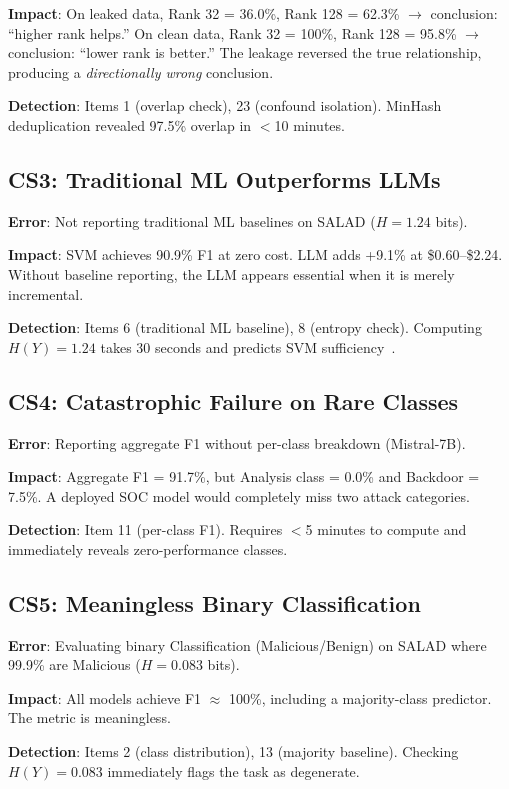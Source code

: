 \documentclass[review,3p]{elsarticle}
\begin{document}
\textbf{Impact}: On leaked data, Rank 32 = 36.0\%, Rank 128 = 62.3\% $\to$ conclusion: ``higher rank helps.'' On clean data, Rank 32 = 100\%, Rank 128 = 95.8\% $\to$ conclusion: ``lower rank is better.'' The leakage reversed the true relationship, producing a \emph{directionally wrong} conclusion.

\textbf{Detection}: Items 1 (overlap check), 23 (confound isolation). MinHash deduplication revealed 97.5\% overlap in $<$10 minutes.

\subsection{CS3: Traditional ML Outperforms LLMs}
\textbf{Error}: Not reporting traditional ML baselines on SALAD ($H = 1.24$ bits).

\textbf{Impact}: SVM achieves 90.9\% F1 at zero cost. LLM adds +9.1\% at \$0.60--\$2.24. Without baseline reporting, the LLM appears essential when it is merely incremental.

\textbf{Detection}: Items 6 (traditional ML baseline), 8 (entropy check). Computing $H(Y) = 1.24$ takes 30 seconds and predicts SVM sufficiency~\cite{p8}.

\subsection{CS4: Catastrophic Failure on Rare Classes}
\textbf{Error}: Reporting aggregate F1 without per-class breakdown (Mistral-7B).

\textbf{Impact}: Aggregate F1 = 91.7\%, but Analysis class = 0.0\% and Backdoor = 7.5\%. A deployed SOC model would completely miss two attack categories.

\textbf{Detection}: Item 11 (per-class F1). Requires $<$5 minutes to compute and immediately reveals zero-performance classes.

\subsection{CS5: Meaningless Binary Classification}
\textbf{Error}: Evaluating binary Classification (Malicious/Benign) on SALAD where 99.9\% are Malicious ($H = 0.083$ bits).

\textbf{Impact}: All models achieve F1 $\approx$ 100\%, including a majority-class predictor. The metric is meaningless.

\textbf{Detection}: Items 2 (class distribution), 13 (majority baseline). Checking $H(Y) = 0.083$ immediately flags the task as degenerate.
\end{document}
